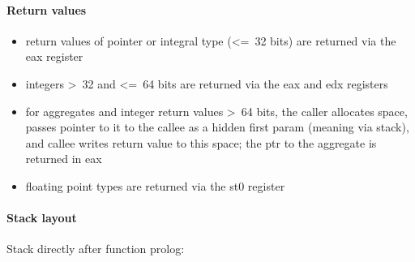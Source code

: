 
\paragraph{Return values}

\begin{itemize}
\item return values of pointer or integral type (\textless=\ 32 bits) are returned via the eax register
\item integers \textgreater\ 32 and \textless=\ 64 bits are returned via the eax and edx registers
\item for aggregates and integer return values \textgreater\ 64 bits, the caller allocates space, passes pointer to it to the callee as a hidden first param
(meaning via stack), and callee writes return value to this space; the ptr to the aggregate is returned in eax
\item floating point types are returned via the st0 register
\end{itemize}


\paragraph{Stack layout}

Stack directly after function prolog:\\

